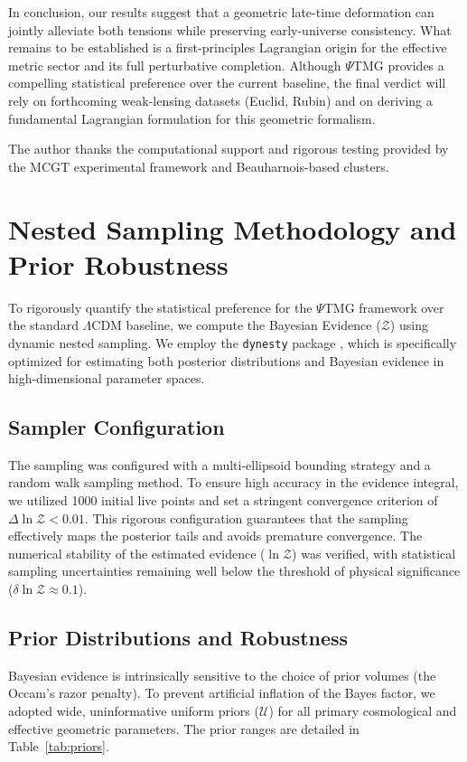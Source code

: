 \documentclass[10pt,twocolumn,secnumarabic,amssymb, nobibnotes, aps, prd, floatfix]{revtex4-2}
\begin{document}
In conclusion, our results suggest that a geometric late-time deformation can jointly alleviate both tensions while preserving early-universe consistency. What remains to be established is a first-principles Lagrangian origin for the effective metric sector and its full perturbative completion. Although $\Psi$TMG provides a compelling statistical preference over the current baseline, the final verdict will rely on forthcoming weak-lensing datasets (Euclid, Rubin) and on deriving a fundamental Lagrangian formulation for this geometric formalism.

\vspace{-0.12cm}
\begin{acknowledgments}
The author thanks the computational support and rigorous testing provided by the MCGT experimental framework and Beauharnois-based clusters.
\end{acknowledgments}

\appendix
\section{Nested Sampling Methodology and Prior Robustness}
\label{app:nested_sampling}

To rigorously quantify the statistical preference for the $\Psi$TMG framework over the standard $\Lambda$CDM baseline, we compute the Bayesian Evidence ($\mathcal{Z}$) using dynamic nested sampling. We employ the \texttt{dynesty} package \cite{Speagle2020Dynesty}, which is specifically optimized for estimating both posterior distributions and Bayesian evidence in high-dimensional parameter spaces.

\subsection{Sampler Configuration}
The sampling was configured with a multi-ellipsoid bounding strategy and a random walk sampling method. To ensure high accuracy in the evidence integral, we utilized 1000 initial live points and set a stringent convergence criterion of $\Delta \ln \mathcal{Z} < 0.01$. This rigorous configuration guarantees that the sampling effectively maps the posterior tails and avoids premature convergence. The numerical stability of the estimated evidence ($\ln \mathcal{Z}$) was verified, with statistical sampling uncertainties remaining well below the threshold of physical significance ($\delta \ln \mathcal{Z} \approx 0.1$).

\subsection{Prior Distributions and Robustness}
Bayesian evidence is intrinsically sensitive to the choice of prior volumes (the Occam's razor penalty). To prevent artificial inflation of the Bayes factor, we adopted wide, uninformative uniform priors ($\mathcal{U}$) for all primary cosmological and effective geometric parameters. The prior ranges are detailed in Table~\ref{tab:priors}.
\end{document}
